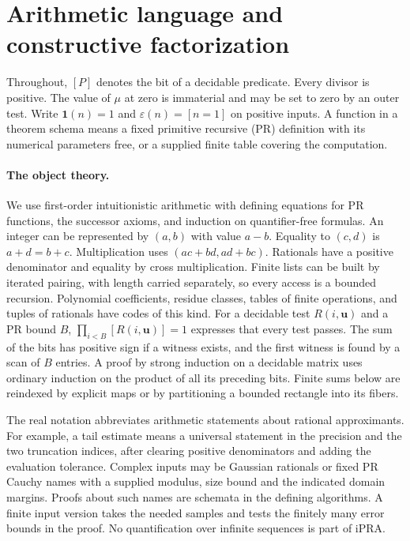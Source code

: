 \section{Arithmetic language and constructive factorization}\label{sec:arith}

Throughout, $[P]$ denotes the bit of a decidable predicate. Every divisor
is positive. The value of $\mu$ at zero is immaterial and may be set to
zero by an outer test. Write $\mathbf1(n)=1$ and $\varepsilon(n)=[n=1]$ on
positive inputs. A function in a theorem schema means a fixed
primitive recursive (PR) definition with its numerical parameters free,
or a supplied finite table covering the computation.

\paragraph{The object theory.}
We use first-order intuitionistic arithmetic with defining equations
for PR functions, the successor axioms, and induction on quantifier-free
formulas. An integer can be represented by $(a,b)$ with value $a-b$.
Equality to $(c,d)$ is $a+d=b+c$. Multiplication uses
$(ac+bd,ad+bc)$. Rationals have a positive denominator and equality by
cross multiplication. Finite lists can be built by iterated pairing,
with length carried separately, so every access is a bounded recursion.
Polynomial coefficients, residue classes, tables of finite operations,
and tuples of rationals have codes of this kind.
For a decidable test $R(i,\mathbf u)$ and a PR bound $B$,
$\prod_{i<B}[R(i,\mathbf u)]=1$ expresses that every test passes.
The sum of the bits has positive sign if a witness exists, and the first
witness is found by a scan of $B$ entries. A proof by strong induction
on a decidable matrix uses ordinary induction on the product of all its
preceding bits. Finite sums below are reindexed by explicit maps or by
partitioning a bounded rectangle into its fibers.

The real notation abbreviates arithmetic statements about rational
approximants. For example, a tail estimate means a universal statement
in the precision and the two truncation indices, after clearing positive
denominators and adding the evaluation tolerance. Complex
inputs may be Gaussian rationals or fixed PR Cauchy names with a supplied
modulus, size bound and the indicated domain margins. Proofs about such
names are schemata in the defining algorithms. A finite input version
takes the needed samples and tests the finitely many error bounds in the
proof. No quantification over infinite sequences is part of iPRA.

